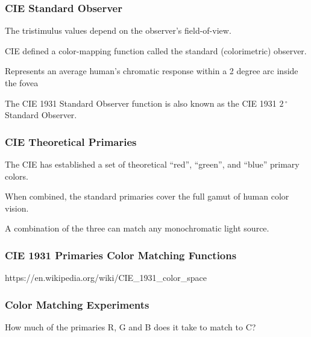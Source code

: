 \documentclass[12pt]{beamer}\usepackage[]{graphicx}\usepackage[]{color}
\begin{document}
\begin{frame}
\frametitle{CIE Standard Observer}

\bi
  \item The tristimulus values depend on the observer's field-of-view.
  \item CIE defined a color-mapping function called the standard (colorimetric) observer.
  \item Represents an average human's chromatic response within a 2 degree 
  arc inside the fovea
  \item The CIE 1931 Standard Observer function is also known as the CIE 1931 
  $2\,^{\circ}$ Standard Observer.
\ei

\end{frame}


\begin{frame}
\frametitle{CIE Theoretical Primaries}

\bbi
  \item The CIE has established a set of theoretical ``red'', ``green'', and 
  ``blue'' primary colors.
  \item When combined, the standard primaries cover the full gamut of human
  color vision.
  \item A combination of the three can match any monochromatic light source.
\ei

\end{frame}


\begin{frame}
\frametitle{CIE 1931 Primaries Color Matching Functions}
\begin{center}

{\scriptsize {\lolit https://en.wikipedia.org/wiki/CIE\_1931\_color\_space}}
\end{center}
\end{frame}


\begin{frame}
\frametitle{Color Matching Experiments}
\begin{center}
\end{center}
How much of the primaries R, G and B does it take to match to C?

\end{frame}
\end{document}
